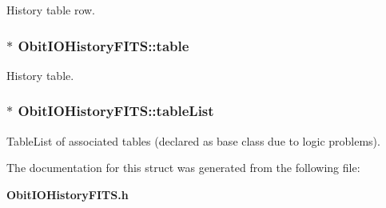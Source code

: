 History table row. 

\subsubsection{$\ast$ {\bf Obit\-IOHistory\-FITS::table}}\label{structObitIOHistoryFITS_o14}


History table. 

\subsubsection{$\ast$ {\bf Obit\-IOHistory\-FITS::table\-List}}\label{structObitIOHistoryFITS_o9}


Table\-List of associated tables (declared as base class due to logic problems). 



The documentation for this struct was generated from the following file:\begin{CompactItemize}
\item 
{\bf Obit\-IOHistory\-FITS.h}\end{CompactItemize}
